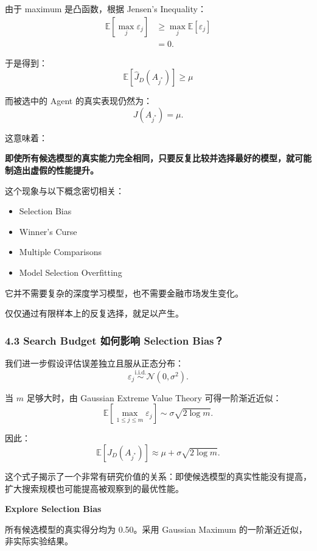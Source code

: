 由于 maximum 是凸函数，根据 Jensen's Inequality：
\[\begin{aligned}
\mathbb E[\max_j\varepsilon_j]
&\geq
\max_j\mathbb E[\varepsilon_j]\\
&=0.
\end{aligned}\]

于是得到：
\[\boxed{
\mathbb E[\widehat J_D(A_{j^*})]
\geq
\mu
}\]

而被选中的 Agent 的真实表现仍然为：
\[J(A_{j^*})=\mu.\]

这意味着：

\textbf{即使所有候选模型的真实能力完全相同，只要反复比较并选择最好的模型，就可能制造出虚假的性能提升。}

这个现象与以下概念密切相关：

\begin{itemize}
\tightlist
\item
  Selection Bias
\item
  Winner's Curse
\item
  Multiple Comparisons
\item
  Model Selection Overfitting
\end{itemize}

它并不需要复杂的深度学习模型，也不需要金融市场发生变化。

仅仅通过有限样本上的反复选择，就足以产生。

\hypertarget{part-1-03-0001-search-budget-ux5982ux4f55ux5f71ux54cd-selection-bias}{%
\subsubsection{4.3 Search Budget 如何影响 Selection Bias？}\label{part-1-03-0001-search-budget-ux5982ux4f55ux5f71ux54cd-selection-bias}}

我们进一步假设评估误差独立且服从正态分布：
\[\varepsilon_j
\overset{\mathrm{i.i.d.}}{\sim}
\mathcal N(0,\sigma^2).\]

当 \(m\) 足够大时，由 Gaussian Extreme Value Theory 可得一阶渐近近似：
\[\mathbb E\left[\max_{1\leq j\leq m}
\varepsilon_j\right]
\sim
\sigma\sqrt{2\log m}.\]

因此：
\[\mathbb E[\widehat J_D(A_{j^*})]
\approx
\mu+\sigma\sqrt{2\log m}.\]

这个式子揭示了一个非常有研究价值的关系：即使候选模型的真实性能没有提高，扩大搜索规模也可能提高被观察到的最优性能。

\textbf{Explore Selection Bias}

所有候选模型的真实得分均为 0.50。采用 Gaussian Maximum 的一阶渐近近似，非实际实验结果。

